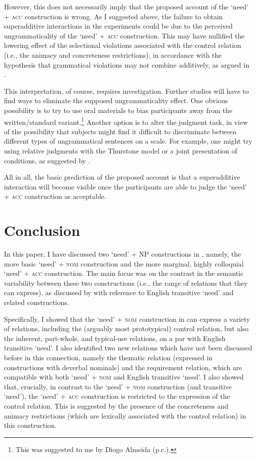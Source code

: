 \documentclass[output=paper,colorlinks,citecolor=brown]{langscibook}
\begin{document}
However, this does not necessarily imply that the proposed account of the `need' + \textsc{acc} construction is wrong. As I suggested above, the failure to obtain superadditive interactions in the experiments could be due to the perceived ungrammaticality of the `need' + \textsc{acc} construction. This may have nullified the lowering effect of the selectional violations associated with the control relation (i.e., the animacy and concreteness restrictions), in accordance with the hypothesis that grammatical violations may not combine additively, as argued in \citet{Hofmeister.Casasanto.Staum.Sag2014}.

This interpretation, of course, requires investigation. Further studies will have to find ways to eliminate the supposed ungrammaticality effect. One obvious possibility is to try to use oral materials to bias participants away from the written/standard variant.\footnote{This was suggested to me by Diogo Almeida (p.c.).} Another option is to alter the judgment task, in view of the possibility that subjects might find it difficult to discriminate between different types of ungrammatical sentences on a scale. For example, one might try using relative judgments with the Thurstone model \citep[see][]{Langsford.etal2018} or a joint presentation of conditions, as suggested by \citet{Marty.Chemla.Sprouse2020}.

All in all, the basic prediction of the proposed account is that a superadditive interaction will become visible once the participants are able to judge the `need' + \textsc{acc} construction as acceptable.

\section{Conclusion\label{section-conclusion}}

In this paper, I have discussed two `need' + NP constructions in , namely, the more basic `need' + \textsc{nom} construction and the more marginal, highly colloquial `need' + \textsc{acc} construction. The main focus was on the contrast in the semantic variability between these two constructions (i.e., the range of relations that they can express), as discussed by \citet{Zaroukian.Beller2013} with reference to English transitive `need' and related constructions.

Specifically, I showed that the `need' + \textsc{nom} construction in 
can express a variety of relations, including the (arguably most prototypical) control relation, but also the inherent, part-whole, and typical-use relations, on a par with English transitive `need'. I also identified two new relations which have not been discussed before in this connection, namely the thematic relation (expressed in constructions with deverbal nominals) and the requirement relation, which are compatible with both `need' + \textsc{nom} and English transitive `need'. I also showed that, crucially, in contrast to the `need' + \textsc{nom} construction (and transitive `need'), the `need' + \textsc{acc} construction is restricted to the expression of the control relation. This is suggested by the presence of the concreteness and animacy restrictions (which are lexically associated with the control relation) in this construction.
\end{document}

